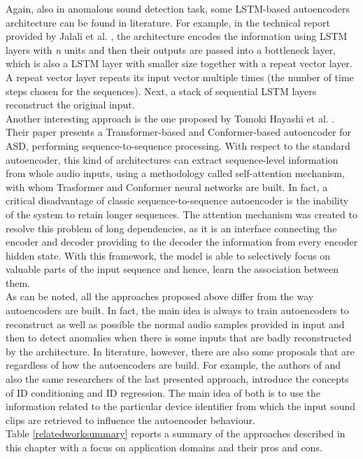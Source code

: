 Again, also in anomalous sound detection task, some LSTM-based autoencoders architecture can be found in literature. For example, in the technical report provided by Jalali et al. \cite{16LSTMDeepAutoencodersForASDtask}, the architecture encodes the information using LSTM layers with \textit{n} units and then their outputs are passed into a bottleneck layer, which is also a LSTM layer with smaller size together with a repeat vector layer. A repeat vector layer repeats its input vector multiple times (the number of time steps chosen for the sequences). Next, a stack of sequential LSTM layers reconstruct the original input.\\
Another interesting approach is the one proposed by Tomoki Hayashi et al. \cite{17ConformerBasedIDAWAREAutoencoder}. Their paper presents a Transformer-based and Conformer-based autoencoder for ASD, performing sequence-to-sequence processing. With respect to the standard autoencoder, this kind of architectures can extract sequence-level information from whole audio inputs, using a methodology called self-attention mechanism, with whom Trasformer and Conformer neural networks are built. In fact, a critical disadvantage of classic sequence-to-sequence autoencoder is the inability of the system to retain longer sequences. The attention mechanism was created to resolve this problem of long dependencies, as it is an interface connecting the encoder and decoder providing to the decoder the information from every encoder hidden state. With this framework, the model is able to selectively focus on valuable parts of the input sequence and hence, learn the association between them.\\
As can be noted, all the approaches proposed above differ from the way autoencoders are built. In fact, the main idea is always to train autoencoders to reconstruct as well as possible the normal audio samples provided in input and then to detect anomalies when there is some inputs that are badly reconstructed by the architecture. In literature, however, there are also some proposals that are regardless of how the autoencoders are build. For example, the authors of \cite{18IDConditionedAutoEncoder}\cite{19DescriptionDiscussionDCASE2020} and also the same researchers of the last presented approach, introduce the concepts of ID conditioning and ID regression. The main idea of both is to use the information related to the particular device identifier from which the input sound clips are retrieved to influence the autoencoder behaviour.\\ 
Table \ref{relatedworksummary} reports a summary of the approaches described in this chapter with a focus on application domains and their pros and cons.

